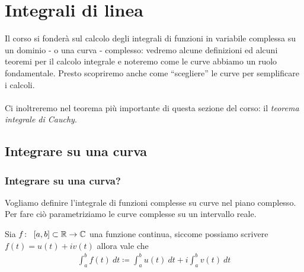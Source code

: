 \chapter{Integrali di linea}
Il corso si fonderà sul calcolo degli integrali di funzioni in variabile complessa su un dominio - o una curva - complesso: vedremo alcune definizioni ed alcuni teoremi per il calcolo integrale e noteremo come le curve abbiamo un ruolo fondamentale. Presto scopriremo anche come \enquote{scegliere} le curve per semplificare i calcoli. \\ \\ Ci inoltreremo nel teorema più importante di questa sezione del corso: il \textit{teorema integrale di Cauchy}.
\newpage
\section{Integrare su una curva}
\subsection{\textcolor{AnComp}{\textbf{Integrare su una curva?}}}

Vogliamo definire l'integrale di funzioni complesse su curve nel piano complesso. Per fare ciò parametriziamo le curve complesse su un intervallo reale. 

\begin{definition}
	\label{defn:integrale-funzione-complessa-parametrizzata-su-intervallo-reale}
	Sia $f \colon\ \left[a,b\right]\subset \mathbb{R} \rightarrow \mathbb{C}$ una funzione continua, siccome possiamo scrivere $f(t) = u(t)+ iv(t)$ allora vale che
	\begin{equation*}
	\begin{aligned}
	\int_{a}^{b} f(t)\ dt \coloneqq \int_{a}^{b} u(t)\ dt + i \int_{a}^{b} v(t)\ dt 
	\end{aligned}
	\end{equation*}
\end{definition}

